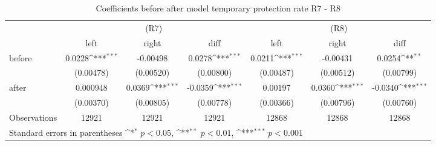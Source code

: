 \begin{table}[!ht]\centering \footnotesize
\def\sym#1{\ifmmode^{#1}\else\(^{#1}\)\fi}
\caption{Coefficients before after model temporary protection rate R7 - R8}
\begin{tabular}{l*{6}{c}}
\hline\hline
                    &\multicolumn{3}{c}{(R7)}&\multicolumn{3}{c}{(R8)}\\
&\multicolumn{1}{c}{left}&\multicolumn{1}{c}{right}&\multicolumn{1}{c}{diff}&\multicolumn{1}{c}{left}&\multicolumn{1}{c}{right}&\multicolumn{1}{c}{diff}\\
\hline
before              &      0.0228\sym{***}&    -0.00498         &      0.0278\sym{***}&      0.0211\sym{***}&    -0.00431         &      0.0254\sym{**} \\
                    &   (0.00478)         &   (0.00520)         &   (0.00800)         &   (0.00487)         &   (0.00512)         &   (0.00799)         \\
[0,5em]
after               &    0.000948         &      0.0369\sym{***}&     -0.0359\sym{***}&     0.00197         &      0.0360\sym{***}&     -0.0340\sym{***}\\
                    &   (0.00370)         &   (0.00805)         &   (0.00778)         &   (0.00366)         &   (0.00796)         &   (0.00760)         \\
\hline
Observations        &       12921         &       12921         &       12921         &       12868         &       12868         &       12868         \\
\hline\hline
\multicolumn{7}{l}{\footnotesize Standard errors in parentheses \sym{*} \(p<0.05\), \sym{**} \(p<0.01\), \sym{***} \(p<0.001\)}\\
\end{tabular}
\end{table}

